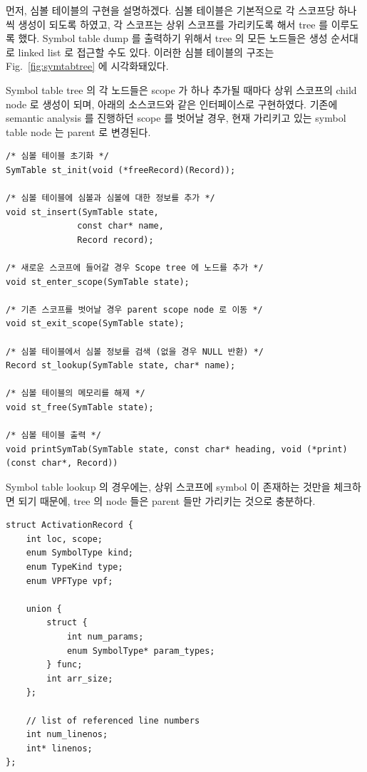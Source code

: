 \documentclass[a4paper, 12p]{paper}
\begin{document}
먼저, 심볼 테이블의 구현을 설명하겠다. 심볼 테이블은 기본적으로 각 스코프당 하나씩 생성이 되도록 하였고, 각 스코프는 상위 스코프를 가리키도록 해서 tree 를 이루도록 했다. Symbol table dump 를 출력하기 위해서 tree 의 모든 노드들은 생성 순서대로 linked list 로 접근할 수도 있다. 이러한 심블 테이블의 구조는 Fig.~\ref{fig:symtabtree} 에 시각화돼있다.

Symbol table tree 의 각 노드들은 scope 가 하나 추가될 때마다 상위 스코프의 child node 로 생성이 되며, 아래의 소스코드와 같은 인터페이스로 구현하였다. 기존에 semantic analysis 를 진행하던 scope 를 벗어날 경우, 현재 가리키고 있는 symbol table node 는 parent 로 변경된다.

\begin{verbatim}
/* 심볼 테이블 초기화 */
SymTable st_init(void (*freeRecord)(Record));

/* 심볼 테이블에 심볼과 심볼에 대한 정보를 추가 */
void st_insert(SymTable state, 
              const char* name,
              Record record);

/* 새로운 스코프에 들어갈 경우 Scope tree 에 노드를 추가 */
void st_enter_scope(SymTable state);

/* 기존 스코프를 벗어날 경우 parent scope node 로 이동 */
void st_exit_scope(SymTable state); 

/* 심볼 테이블에서 심볼 정보를 검색 (없을 경우 NULL 반환) */
Record st_lookup(SymTable state, char* name); 

/* 심볼 테이블의 메모리를 해제 */
void st_free(SymTable state); 

/* 심볼 테이블 출력 */
void printSymTab(SymTable state, const char* heading, void (*print)(const char*, Record)) 
\end{verbatim}

Symbol table lookup 의 경우에는, 상위 스코프에 symbol 이 존재하는 것만을 체크하면 되기 때문에, tree 의 node 들은 parent 들만 가리키는 것으로 충분하다.

\begin{verbatim}
struct ActivationRecord {
    int loc, scope;
    enum SymbolType kind;
    enum TypeKind type;
    enum VPFType vpf;

    union {
        struct {
            int num_params;
            enum SymbolType* param_types;
        } func;
        int arr_size;
    };

    // list of referenced line numbers
    int num_linenos;
    int* linenos;
};
\end{verbatim}
\end{document}
